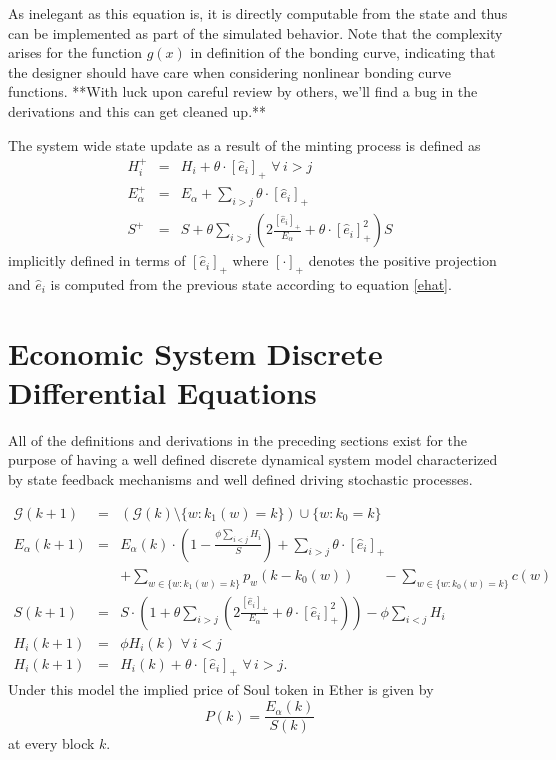 \documentclass[11pt]{amsart}
\begin{document}
As inelegant as this equation is, it is directly computable from the state and thus can be implemented as part of the simulated behavior.  Note that the complexity arises for the function $g(x)$ in definition of the bonding curve, indicating that the designer should have care when considering nonlinear bonding curve functions. **With luck upon careful review by others, we'll find a bug in the derivations and this can get cleaned up.**

The system wide state update as a result of the minting process is defined as
\begin{eqnarray}
H_i^+ &=&  H_i + \theta\cdot [\hat e_i]_+ \,\,\forall \,i>j\\
E_\alpha^+ &=& E_\alpha + \sum_{i>j}  \theta\cdot [\hat e_i]_+\\
S^+ &=& S + \theta \sum_{i>j} \left(2\frac{[\hat e_i]_+}{E_\alpha}+\theta\cdot [\hat e_i]^2_+\right)S 
\end{eqnarray}
implicitly defined in terms of $[\hat e_i]_+$ where $[\cdot]_+$ denotes the positive projection and $\hat e_i$ is computed from the previous state according to equation \eqref{ehat}.
\section{Economic System Discrete Differential Equations}

All of the definitions and derivations in the preceding sections exist for the purpose of having a well defined discrete dynamical system model characterized by state feedback mechanisms and well defined driving stochastic processes.

\begin{eqnarray}
\mathcal{G}(k+1) &=& \left(\mathcal{G}(k) \setminus \{w: k_1(w)=k\}\right) \cup \{w : k_0 = k\} \\
E_\alpha(k+1) &=& E_\alpha(k) \cdot \left(1- \frac{\phi \sum_{i<j} H_i}{S}\right) + \sum_{i>j}  \theta\cdot [\hat e_i]_+\\
&&+\sum_{w\in\{w: k_1(w)=k\}} p_w\left(k-k_0(w)\right)  \qquad-\sum_{w\in\{w : k_0(w) = k\}} c(w)\\
S(k+1) &=& S \cdot \left(1+ \theta \sum_{i>j} \left(2\frac{[\hat e_i]_+}{E_\alpha}+\theta\cdot [\hat e_i]^2_+\right)\right)- \phi \sum_{i<j} H_i \\
H_i(k+1) &=& \phi H_i(k) \,\,\forall \,i<j\\
H_i(k+1) &=& H_i(k) + \theta\cdot [\hat e_i]_+ \,\,\forall \,i>j.
\end{eqnarray}
Under this model the implied price of Soul token in Ether is given by
\begin{equation}
P(k) = \frac{E_\alpha(k)}{S(k)}
\end{equation}
at every block $k$.
\end{document}

